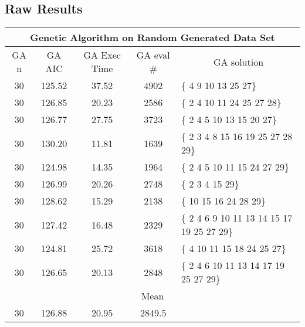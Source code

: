 \subsection{Raw Results}
\label{rawResultsRandom30}
\begin{tabular}{|c|c|c|c|l|}
	\hline
	\multicolumn{5}{|c|}{Genetic Algorithm on Random Generated Data Set}                                   \\ \hline
	GA n & GA AIC & GA Exec Time & GA eval \# & \multicolumn{1}{c|}{GA solution}           \\ \hline
	30   & 125.52 & 37.52             & 4902                  & \{ 4 9 10 13 25 27\}                       \\ \hline
	30   & 126.85 & 20.23             & 2586                  & \{ 2 4 10 11 24 25 27 28\}                 \\ \hline
	30   & 126.77 & 27.75             & 3723                  & \{ 2 4 5 10 13 15 20 27\}                  \\ \hline
	30   & 130.20 & 11.81             & 1639                  & \{ 2 3 4 8 15 16 19 25 27 28 29\}          \\ \hline
	30   & 124.98 & 14.35             & 1964                  & \{ 2 4 5 10 11 15 24 27 29\}               \\ \hline
	30   & 126.99 & 20.26             & 2748                  & \{ 2 3 4 15 29\}                           \\ \hline
	30   & 128.62 & 15.29             & 2138                  & \{ 10 15 16 24 28 29\}                     \\ \hline
	30   & 127.42 & 16.48             & 2329                  & \{ 2 4 6 9 10 11 13 14 15 17 19 25 27 29\} \\ \hline
	30   & 124.81 & 25.72             & 3618                  & \{ 4 10 11 15 18 24 25 27\}                \\ \hline
	30   & 126.65 & 20.13             & 2848                  & \{ 2 4 6 10 11 13 14 17 19 25 27 29\}      \\ \hline
	\multicolumn{5}{|c|}{Mean}                                                                             \\ \hline
	30   & 126.88 & 20.95             & 2849.5                &                                            \\ \hline
\end{tabular}

